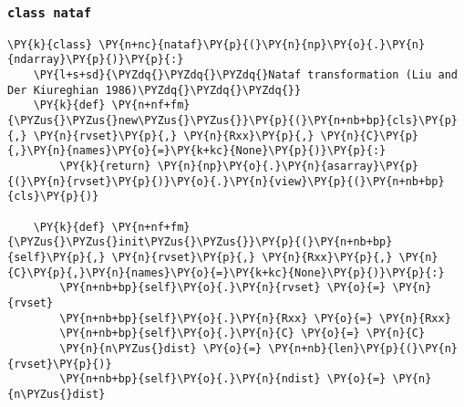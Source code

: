     \hypertarget{class-nataf}{%
\subsubsection{\texorpdfstring{\texttt{class\ nataf}}{class nataf}}\label{class-nataf}}

    \begin{tcolorbox}[breakable, size=fbox, boxrule=1pt, pad at break*=1mm,colback=cellbackground, colframe=cellborder]
\begin{Verbatim}[commandchars=\\\{\}]
  \PY{k}{class} \PY{n+nc}{nataf}\PY{p}{(}\PY{n}{np}\PY{o}{.}\PY{n}{ndarray}\PY{p}{)}\PY{p}{:}
    \PY{l+s+sd}{\PYZdq{}\PYZdq{}\PYZdq{}Nataf transformation (Liu and Der Kiureghian 1986)\PYZdq{}\PYZdq{}\PYZdq{}}
    \PY{k}{def} \PY{n+nf+fm}{\PYZus{}\PYZus{}new\PYZus{}\PYZus{}}\PY{p}{(}\PY{n+nb+bp}{cls}\PY{p}{,} \PY{n}{rvset}\PY{p}{,} \PY{n}{Rxx}\PY{p}{,} \PY{n}{C}\PY{p}{,}\PY{n}{names}\PY{o}{=}\PY{k+kc}{None}\PY{p}{)}\PY{p}{:}
        \PY{k}{return} \PY{n}{np}\PY{o}{.}\PY{n}{asarray}\PY{p}{(}\PY{n}{rvset}\PY{p}{)}\PY{o}{.}\PY{n}{view}\PY{p}{(}\PY{n+nb+bp}{cls}\PY{p}{)}

    \PY{k}{def} \PY{n+nf+fm}{\PYZus{}\PYZus{}init\PYZus{}\PYZus{}}\PY{p}{(}\PY{n+nb+bp}{self}\PY{p}{,} \PY{n}{rvset}\PY{p}{,} \PY{n}{Rxx}\PY{p}{,} \PY{n}{C}\PY{p}{,}\PY{n}{names}\PY{o}{=}\PY{k+kc}{None}\PY{p}{)}\PY{p}{:}
        \PY{n+nb+bp}{self}\PY{o}{.}\PY{n}{rvset} \PY{o}{=} \PY{n}{rvset}
        \PY{n+nb+bp}{self}\PY{o}{.}\PY{n}{Rxx} \PY{o}{=} \PY{n}{Rxx}
        \PY{n+nb+bp}{self}\PY{o}{.}\PY{n}{C} \PY{o}{=} \PY{n}{C}
        \PY{n}{n\PYZus{}dist} \PY{o}{=} \PY{n+nb}{len}\PY{p}{(}\PY{n}{rvset}\PY{p}{)}
        \PY{n+nb+bp}{self}\PY{o}{.}\PY{n}{ndist} \PY{o}{=} \PY{n}{n\PYZus{}dist}


\end{Verbatim}
\end{tcolorbox}
